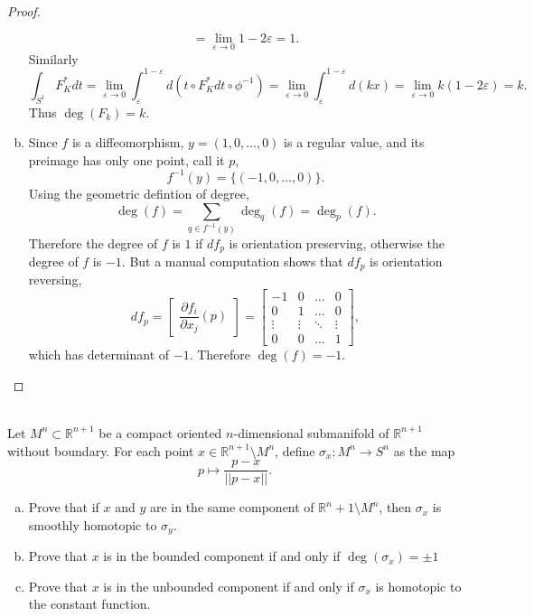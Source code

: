 \documentclass{article}
\newenvironment{problem}[2][Problem]{\begin{trivlist}
\item[\hskip \labelsep {\bfseries #1}\hskip \labelsep {\bfseries #2.}]}{\end{trivlist}}
\begin{document}
\begin{proof}
\begin{enumerate}[(a)]
\[          = \lim_{\varepsilon \rightarrow 0} 1 - 2\varepsilon
          = 1.
      \] Similarly \[
        \int_{S^1}F_K^*dt
          = \lim_{\varepsilon \rightarrow 0} \int_\varepsilon^{1 - \varepsilon} d(t \circ F_K^*dt \circ \phi^{-1})
          = \lim_{\varepsilon \rightarrow 0} \int_\varepsilon^{1 - \varepsilon} d(kx)
          = \lim_{\varepsilon \rightarrow 0} k(1 - 2\varepsilon)
          = k.
      \]
      Thus $\deg(F_k) = k$.
    \item Since $f$ is a diffeomorphism, $y = (1, 0, \hdots, 0)$ is a regular
    value, and its preimage has only one point, call it $p$, \[
      f^{-1}(y) = \{(-1, 0, \hdots, 0)\}.
    \]
    Using the geometric defintion of degree, \[
      \deg(f) = \sum_{q \in f^{-1}(y)} \deg_q(f) = \deg_p(f).
    \]
    Therefore the degree of $f$ is $1$ if $df_p$ is orientation preserving,
    otherwise the degree of $f$ is $-1$. But a manual computation shows that
    $df_p$ is orientation reversing,
    \[
      df_p
      = \begin{bmatrix}
        \dfrac{\partial f_i}{\partial x_j}(p)
      \end{bmatrix}
      = \begin{bmatrix}
        -1 & 0 & \hdots & 0\\
        0  & 1 & \hdots & 0\\
        \vdots  & \vdots & \ddots & \vdots\\
        0  & 0 & \hdots & 1
      \end{bmatrix},
    \] which has determinant of $-1$. Therefore $\deg(f) = -1.$
  \end{enumerate}
\end{proof}
\pagebreak

\begin{problem}{7} \text{} \\
  Let $M^n \subset \mathbb{R}^{n+1}$ be a compact oriented $n$-dimensional
  submanifold of $\mathbb{R}^{n+1}$ without boundary. For each point
  $x \in \mathbb{R}^{n+1}\setminus M^n$, define
  $\sigma_x\colon M^n \rightarrow S^n$ as the map \[
    p \mapsto \frac{p-x}{||p - x||}.
  \]
  \begin{enumerate}[(a)]
    \item Prove that if $x$ and $y$ are in the same component of
      $\mathbb{R}^n+1 \setminus M^n$, then $\sigma_x$ is smoothly homotopic to
      $\sigma_y$.
    \item Prove that $x$ is in the bounded component if and only if
      $\deg(\sigma_x) = \pm1$
    \item Prove that $x$ is in the unbounded component if and only if $\sigma_x$
      is homotopic to the constant function.
  \end{enumerate}
\end{problem}
\end{document}

